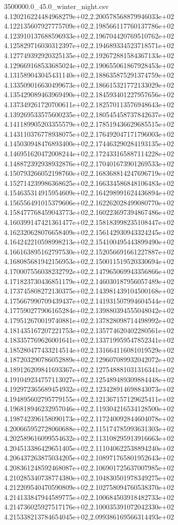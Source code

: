 \begin{filecontents*}{3500000.0_45.0_winter_night.csv}
4.120216224484968279e+02,2.200578568879946033e+02
4.122135607927775709e+02,2.198566117760137786e+02
4.123910137688596933e+02,2.196704420769510762e+02
4.125829716030312397e+02,2.194689334523718571e+02
4.127749392920325135e+02,2.192672881584367133e+02
4.129669168533685024e+02,2.190655061867928453e+02
4.131589043045431140e+02,2.188635875291374759e+02
4.133509016630499673e+02,2.186615321772133029e+02
4.135429089463969490e+02,2.184593401227957656e+02
4.137349261720700611e+02,2.182570113576948643e+02
4.139269533575600235e+02,2.180545458737842637e+02
4.141189905203355579e+02,2.178519436629685515e+02
4.143110376778938075e+02,2.176492047171796003e+02
4.145030948476893400e+02,2.174463290284193135e+02
4.146951620472008244e+02,2.172433165887114228e+02
4.148872392938932876e+02,2.170401673901269533e+02
4.150793266052198760e+02,2.168368814247696719e+02
4.152714239986368625e+02,2.166334586848106483e+02
4.154635314915954609e+02,2.164298991624436894e+02
4.156556491015379606e+02,2.162262028499080770e+02
4.158477768459043773e+02,2.160223697394867486e+02
4.160399147421361477e+02,2.158183998235108447e+02
4.162320628076658409e+02,2.156142930943324245e+02
4.164242210598998213e+02,2.154100495443899490e+02
4.166163895162797530e+02,2.152056691661227887e+02
4.168085681942156953e+02,2.150011519520330694e+02
4.170007556038232792e+02,2.147965069943356866e+02
4.171823730436851179e+02,2.146030187956057489e+02
4.173745808272130375e+02,2.143981439104500168e+02
4.175667990709439437e+02,2.141931507994604544e+02
4.177590277906165284e+02,2.139880394555048042e+02
4.179512670019740881e+02,2.137828098714498992e+02
4.181435167207221753e+02,2.135774620402280561e+02
4.183357769626001641e+02,2.133719959547852341e+02
4.185280477433214514e+02,2.131664116081019529e+02
4.187203290786052889e+02,2.129607089932042072e+02
4.189126209841693367e+02,2.127548881031316341e+02
4.191049234757113027e+02,2.125489489309884448e+02
4.192972365689454932e+02,2.123428914698843073e+02
4.194895602795779155e+02,2.121367157129625411e+02
4.196818946232957046e+02,2.119304216534128500e+02
4.198742396158090173e+02,2.117240092844604078e+02
4.200665952728060688e+02,2.115174785993631303e+02
4.202589616099554632e+02,2.113108295913916663e+02
4.204513386429651405e+02,2.111040622538894240e+02
4.206437263875034205e+02,2.108971765801952643e+02
4.208361248592468087e+02,2.106901725637007985e+02
4.210285340738774380e+02,2.104830501978349275e+02
4.212209540470590809e+02,2.102758094760538370e+02
4.214133847944589775e+02,2.100684503918482733e+02
4.214736025927517176e+02,2.100035391072042330e+02
4.215338213784654045e+02,2.099386169566314493e+02

\end{filecontents*}
